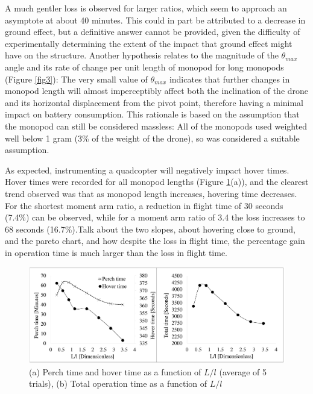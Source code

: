 \documentclass[12pt,a4paper]{article}
\begin{document}
A much gentler loss is observed for larger ratios, which seem to approach an asymptote at about 40 minutes. This could in part be attributed to a decrease in ground effect, but a definitive answer cannot be provided, given the difficulty of experimentally determining the extent of the impact that ground effect might have on the structure. Another hypothesis relates to the magnitude of the $\theta_{max}$ angle and its rate of change per unit length of monopod for long monopods (Figure \ref{fig3}): The very small value of $\theta_{max}$ indicates that further changes in monopod length will almost imperceptibly affect both the inclination of the drone and its horizontal displacement from the pivot point, therefore having a minimal impact on battery consumption. This rationale is based on the assumption that the monopod can still be considered massless: All of the monopods used weighted well below 1 gram (3\% of the weight of the drone), so was considered a suitable assumption.

As expected, instrumenting a quadcopter will negatively impact hover times. Hover times were recorded for all monopod lengths (Figure \ref{fig10}(a)), and the clearest trend observed was that as monopod length increases, hovering time decreases. For the shortest moment arm ratio, a reduction in flight time of 30 seconds (7.4\%) can be observed, while for a moment arm ratio of 3.4 the loss increases to 68 seconds (16.7\%).Talk about the two slopes, about hovering close to ground, and the pareto chart, and how despite the loss in flight time, the percentage gain in operation time is much larger than the loss in flight time.


\begin{figure}[h!]
\centering
 \includegraphics[scale=0.23]{Perch_Time.pdf}
  \caption{(a) Perch time and hover time as a function of $L/l$ (average of 5 trials), (b) Total operation time as a function of $L/l$ }
  \label{fig10}
\end{figure}
\end{document}
